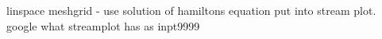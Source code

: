 \documentclass[11pt,a4paper]{report}
\begin{document}
linspace meshgrid - use solution of hamiltons equation put into stream plot. google what streamplot has as inpt9999

\begin{comment}
\begin{itemize}
\item[{\bf a)}] Find Hamilton's equations for this system. [1 point]
\item $K=\frac{1}{2}m_1v_1^2+\frac{1}{2}m_2v_2^2$
\item $V=V(r)=-\frac{Gm_1m_2}{r}$
\item $H=K+V=\frac{1}{2}m_1v_1^2+\frac{1}{2}m_2v_2^2-\frac{Gm_1m_2}{r}$
\item $\dot{r}_1=v_1$

\item -----
\item Using coordinates $q_1=r_x$ and $q_2=R$, such that $\vec{r}=\vec{r_1}-\vec{r_2}$ and $\vec{R}=\frac{\mu}{m_2} \vec{r_1}+\frac{\mu}{m_1}\vec{r_2}$, where $\mu=\frac{m_1m_2}{m_1+m_2}$ is the reduced mass. This yields the Lagrangian (\textbf{vise?})
\item $L=\frac{1}{2}(m_1+m_2)\dot{\vec{R}}^2+\frac{1}{2}\mu\dot{\vec{r}}^2-V(r)$. 
\item Finding the momenta (\textbf{finne direkte i stedet md K+V?)}
\begin{align}
&p_i=\frac{\partial L}{\partial \dot{q_i}}\\
&p_1=\frac{\partial L}{\partial \dot{r}}=\frac{\partial }{\partial \dot{r}}  \left( \frac{1}{2}(m_1+m_2)\dot{\vec{R}}^2+\frac{1}{2}\mu\dot{\vec{r}}^2+\frac{Gm_1m_2}{r}\right)=\mu \dot{\vec{r}} \\
&p_2=\frac{\partial L}{\partial \dot{R}}=(m_1+m_2)\dot{\vec{R}}
\end{align} 
\item Finding the Hamiltonian: $H=\sum_ip_i\dot{q_i}-L=\mu \dot{\vec{r}}^2 +(m_1+m_2)\dot{\vec{R}}^2-\frac{1}{2}(m_1+m_2)\dot{\vec{R}}^2-\frac{1}{2}\mu\dot{\vec{r}}^2-\frac{Gm_1m_2}{r}=\frac{\vec{p_1}^2}{2\mu}+\frac{\vec{p_2}^2}{2(m_1+m_2)}-\frac{Gm_1m_2}{r}$
\item Finding the Hamilton's equations:
\begin{align*}
\dot{q_i}=\frac{\partial H}{\partial p_i}
\dot{p_i}=-\frac{\partial H}{\partial q_i}
\end{align*}
\end{comment}
\end{document}
